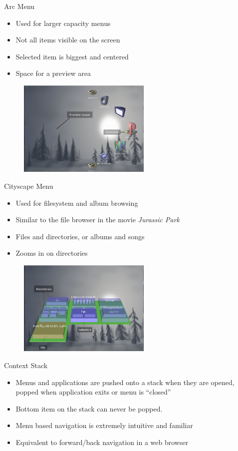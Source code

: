 \documentclass[style=smrt,mode=present,paper=screen]{powerdot}
\begin{document}
\begin{slide}{Arc Menu}
\begin{itemize}
\item Used for larger capacity menus
\item Not all items visible on the screen
\item Selected item is biggest and centered
\item Space for a preview area
\end{itemize}
\begin{figure}[htb]
\includegraphics[width=2.5in]{../design/figures/arc_menu}
\end{figure}
\end{slide}

\begin{slide}{Cityscape Menu}
\begin{itemize}
\item Used for filesystem and album browsing
\item Similar to the file browser in the movie \emph{Jurassic Park}
\item Files and directories, or albums and songs
\item Zooms in on directories
\end{itemize}
\begin{figure}[htb]
\includegraphics[width=2.5in]{../design/figures/city_menu}
\end{figure}
\end{slide}

\begin{slide}{Context Stack}
\begin{itemize}
\item Menus and applications are pushed onto a stack when they are opened,
      popped when application exits or menu is ``closed''
\item Bottom item on the stack can never be popped.
\item Menu based navigation is extremely intuitive and familiar
\item Equivalent to forward/back navigation in a web browser
\end{itemize}
\end{slide}
\end{document}
